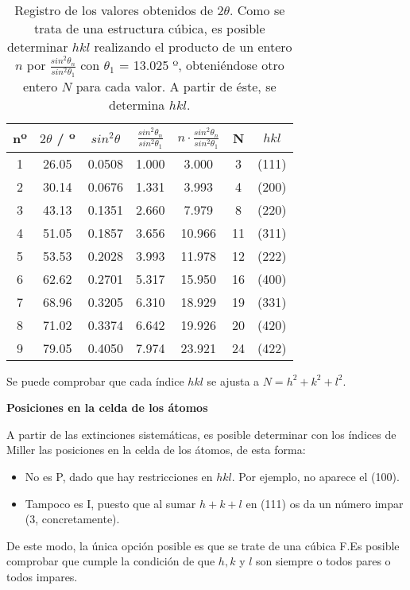 \documentclass[a4paper,twocolumn,10pt]{article}
\begin{document}
\begin{table}[H]
\caption{ Registro de los valores obtenidos de 2$\theta$. Como se trata de una estructura cúbica, es posible determinar $hkl$ realizando el producto de un entero $n$ por $\frac{sin^2\theta_n}{sin^2\theta_1}$ con $\theta_1$ = 13.025 º, obteniéndose otro entero $N$ para cada valor. A partir de éste, se determina $hkl$.}
\centering
\begin{tabular}{c|c|c|c|c|c|c|}
nº & $2\theta$ / º & $sin^2\theta$ & $\frac{sin^2\theta_n}{sin^2\theta_1}$ & $n\cdot\frac{sin^2\theta_n}{sin^2\theta_1}$  & N & $hkl$
\\\hline 
1 & 26.05 & 0.0508  & 1.000 & 3.000 & 3 & (111) \\
2 & 30.14 & 0.0676  & 1.331 & 3.993 & 4 & (200)\\
3 & 43.13 & 0.1351  & 2.660 & 7.979 & 8 &  (220)\\
4 & 51.05 & 0.1857  & 3.656 & 10.966 & 11 & (311)\\
5 & 53.53 & 0.2028  & 3.993 & 11.978 & 12 & (222)\\
6 & 62.62 & 0.2701  & 5.317 & 15.950 & 16 & (400)\\
7 & 68.96 & 0.3205  & 6.310 & 18.929 & 19 & (331)\\
8 & 71.02 & 0.3374  & 6.642 & 19.926 & 20 & (420)\\
9 & 79.05 & 0.4050  & 7.974 & 23.921 & 24 & (422)\\



\end{tabular}
\end{table}

Se puede comprobar que cada índice $hkl$ se ajusta a $N = h^2 + k^2 + l^2$.

\textbf{Posiciones en la celda de los átomos}

A partir de las extinciones sistemáticas, es posible determinar con los índices de Miller las posiciones en la celda de los átomos, de esta forma:
\begin{itemize}

\item No es P, dado que hay restricciones en $hkl$. Por ejemplo, no aparece el (100).
\item Tampoco es I, puesto que al sumar $h+k+l$ en  (111) os da un número impar (3, concretamente).

\end{itemize}

De este modo, la única opción posible es que se trate de una cúbica F.Es posible comprobar que cumple la condición de que $h, k$ y $l$ son siempre o todos pares o todos impares.
\end{document}
